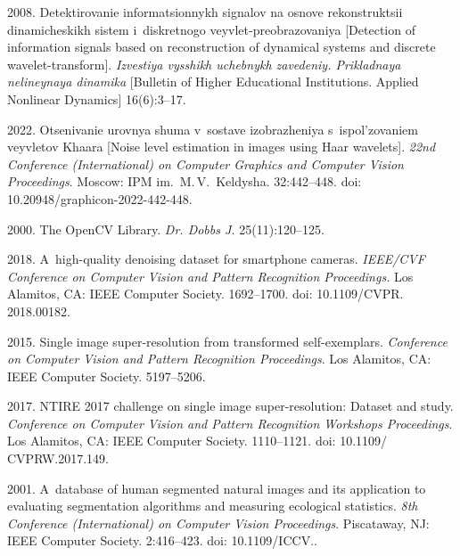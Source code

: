 \begin{multicols}{2}
{{\begin{thebibliography}{99}
     2008. Detektirovanie informatsionnykh signalov na osnove rekonstruktsii 
    dinamicheskikh sistem i~diskretnogo veyvlet-preobrazovaniya
    [Detection of information signals based on reconstruction of dynamical systems and discrete wavelet-transform]. 
    \textit{Izvestiya vysshikh uchebnykh zavedeniy. 
    Prikladnaya nelineynaya dinamika} [Bulletin of Higher Educational Institutions. Applied Nonlinear Dynamics] 16(6):3--17.
    
     2022. Otsenivanie urovnya shuma v~sostave izobrazheniya s~ispol'zovaniem veyvletov Khaara
    [Noise level estimation in images using Haar wavelets].
\textit{22nd Conference (International) on Computer Graphics and Computer Vision Proceedings}.  Moscow:  IPM im.\ M.\,V.~Keldysha. 32:442--448. 
    doi: 10.20948/graphicon-2022-442-448.
 
     2000. The OpenCV Library. \textit{Dr. Dobbs J.}  25(11):120--125.
    
     2018. 
    A~high-quality denoising dataset for smartphone cameras. \textit{IEEE/CVF Conference on Computer Vision and Pattern Recognition Proceedings.} 
    Los Alamitos, CA: IEEE Computer Society. 1692--1700. 
    doi: 10.1109/CVPR. 2018.00182.
   
     2015. Single
    image super-resolution from transformed self-exemplars. \textit{Conference on Computer Vision and Pattern Recognition Proceedings}. 
    Los Alamitos, CA: IEEE Computer Society. 5197--5206.
   
     2017. NTIRE 2017 challenge on single
    image super-resolution: Dataset and study. \textit{Conference on Computer Vision and
    Pattern Recognition Workshops Proceedings}. Los Alamitos, CA: IEEE Computer Society. 1110--1121. doi: 10.1109/ CVPRW.2017.149. 
   
     2001.
    A~database of human segmented natural images and its application to evaluating
    segmentation algorithms and measuring ecological statistics. \textit{8th Conference (International) on Computer Vision 
    Proceedings}. Piscataway, NJ: IEEE Computer Society. 2:416--423. doi: 10.1109/ICCV..
    

\end{thebibliography}}}
\end{multicols}
